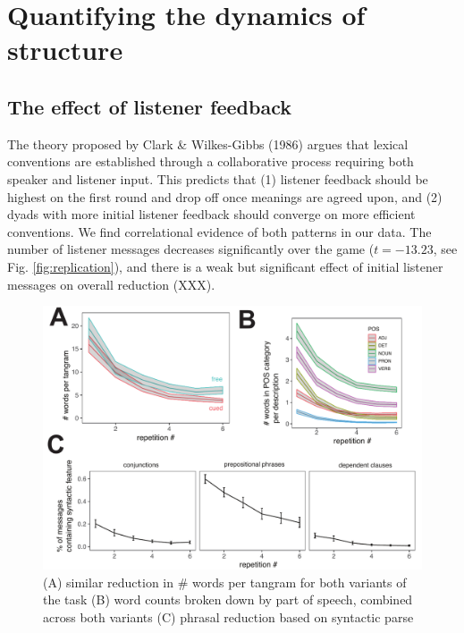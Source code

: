 \documentclass[alpha-refs]{wiley-article}
\begin{document}
\section{Quantifying the dynamics of structure}\label{results}

\subsection{The effect of listener feedback}\label{listener-feedback}

The theory proposed by Clark \& Wilkes-Gibbs (1986) argues that lexical conventions are established through a collaborative process requiring both speaker and listener input. 
This predicts that (1) listener feedback should be highest on the first round and drop off once meanings are agreed upon, and (2) dyads with more initial listener feedback should converge on more efficient conventions. 
We find correlational evidence of both patterns in our data. 
The number of listener messages decreases significantly over the game (\(t = -13.23\), see Fig. \ref{fig:replication}), and there is a weak but significant effect of initial listener messages on overall reduction (XXX).

\begin{figure}[t]
\includegraphics[scale=.65]{reduction.pdf}
\caption{(A) similar reduction in \# words per tangram for both variants of the task (B) word counts broken down by part of speech, combined across both variants (C) phrasal reduction based on syntactic parse }
\label{fig:reduction}
\end{figure}
\end{document}
